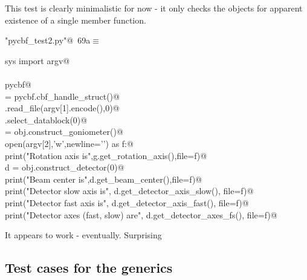 \documentclass[10pt,a4paper,twoside,notitlepage]{article}
\begin{document}
This test is clearly minimalistic for now - it only checks the objects 
for apparent existence of
a single member function.

\begin{flushleft} \small
\begin{minipage}{\linewidth}\label{scrap14}\raggedright\small
{} \verb@"pycbf_test2.py"@\nobreak\ {\footnotesize {69a}}$\equiv$
\vspace{-1ex}
\begin{list}{}{} \item
\mbox{}\verb@from sys import argv@\\
\mbox{}\verb@@\\
\mbox{}\verb@import pycbf@\\
\mbox{}\verb@obj = pycbf.cbf_handle_struct()@\\
\mbox{}\verb@obj.read_file(argv[1].encode(),0)@\\
\mbox{}\verb@obj.select_datablock(0)@\\
\mbox{}\verb@g = obj.construct_goniometer()@\\
\mbox{}\verb@with open(argv[2],'w',newline='\n') as f:@\\
\mbox{}\verb@    print("Rotation axis is",g.get_rotation_axis(),file=f)@\\
\mbox{}\verb@    d = obj.construct_detector(0)@\\
\mbox{}\verb@    print("Beam center is",d.get_beam_center(),file=f)@\\
\mbox{}\verb@    print("Detector slow axis is", d.get_detector_axis_slow(), file=f)@\\
\mbox{}\verb@    print("Detector fast axis is", d.get_detector_axis_fast(), file=f)@\\
\mbox{}\verb@    print("Detector axes (fast, slow) are", d.get_detector_axes_fs(), file=f)@\\
\mbox{}\verb@@{\NWsep}
\end{list}
\vspace{-1.5ex}
\footnotesize
\begin{list}{}{\setlength{\itemsep}{-\parsep}\setlength{\itemindent}{-\leftmargin}}

\item{}
\end{list}
\end{minipage}\vspace{4ex}
\end{flushleft}
It appears to work - eventually. Surprising

\subsection{Test cases for the generics}
\end{document}
